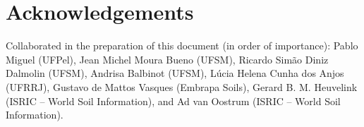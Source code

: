 \tocless\section{Acknowledgements}

Collaborated in the preparation of this document (in order of importance): Pablo Miguel (UFPel), 
Jean Michel Moura Bueno (UFSM), Ricardo Simão Diniz Dalmolin (UFSM), Andrisa Balbinot (UFSM), Lúcia 
Helena Cunha dos Anjos (UFRRJ), Gustavo de Mattos Vasques (Embrapa Soils), Gerard B. M. Heuvelink 
(ISRIC -- World Soil Information), and Ad van Oostrum (ISRIC -- World Soil Information).


